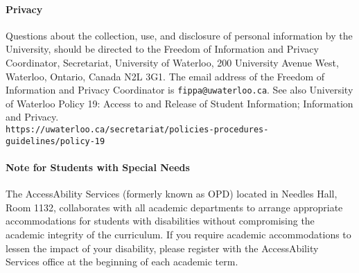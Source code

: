 \documentclass[letterpaper,10pt]{article}
\begin{document}
\paragraph{Privacy}
Questions about the collection, use, and disclosure of personal information by the University, should be directed to the Freedom of Information and Privacy Coordinator, Secretariat, University of Waterloo, 200 University Avenue West, Waterloo, Ontario, Canada N2L 3G1. The email address of the Freedom of Information and Privacy Coordinator is \texttt{fippa@uwaterloo.ca}. See also University of Waterloo Policy 19: Access to and Release of Student Information; Information and Privacy.
\\ \texttt{https://uwaterloo.ca/secretariat/policies-procedures-guidelines/policy-19}

\paragraph{Note for Students with Special Needs}
The AccessAbility Services (formerly known as OPD) located in Needles Hall, Room 1132, collaborates with all academic departments to arrange appropriate accommodations for students with disabilities without compromising the academic integrity of the curriculum. If you require academic accommodations to lessen the impact of your disability, please register with the AccessAbility Services office at the beginning of each academic term.
\end{document}
